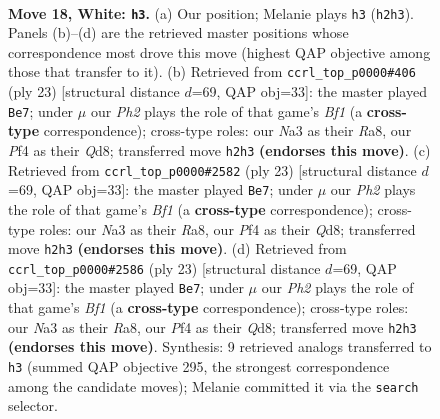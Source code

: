 \documentclass[11pt]{article}
\begin{document}
\clearpage

\begin{figure}[p]\centering
\begin{subfigure}{0.46\textwidth}\centering
\resizebox{\linewidth}{!}{%
\newchessgame
\chessboard[
  setfen={r1b1kbnr/4q3/8/p1p1Ppp1/3p1P1p/NP6/P5PP/R1BQ1BKR w kq - 0 18},
  showmover=false,
  pgfstyle=straightmove, color=movearrow, markmove={h2-h3}
]}
\caption{}
\end{subfigure}\hfill
\begin{subfigure}{0.46\textwidth}\centering
\resizebox{\linewidth}{!}{%
\newchessgame
\chessboard[
  setfen={r2qkb1r/1p1n1pp1/p2p4/N2Ppb1p/8/4BP2/PPPQ2PP/R3KB1R b KQkq - 2 12},
  showmover=false,
  pgfstyle=straightmove, color=movearrow, markmove={f8-e7}
]}
\caption{}
\end{subfigure}
\\[4pt]
\begin{subfigure}{0.46\textwidth}\centering
\resizebox{\linewidth}{!}{%
\newchessgame
\chessboard[
  setfen={r2qkb1r/1p1n1pp1/p2p4/N2Ppb1p/8/4BP2/PPPQ2PP/R3KB1R b KQkq - 2 12},
  showmover=false,
  pgfstyle=straightmove, color=movearrow, markmove={f8-e7}
]}
\caption{}
\end{subfigure}\hfill
\begin{subfigure}{0.46\textwidth}\centering
\resizebox{\linewidth}{!}{%
\newchessgame
\chessboard[
  setfen={r2qkb1r/1p1n1pp1/p2p4/N2Ppb1p/8/4BP2/PPPQ2PP/R3KB1R b KQkq - 2 12},
  showmover=false,
  pgfstyle=straightmove, color=movearrow, markmove={f8-e7}
]}
\caption{}
\end{subfigure}
\caption{\textbf{Move 18, White: \texttt{h3}.} (a) Our position; Melanie plays \texttt{h3} (\texttt{h2h3}). Panels (b)--(d) are the retrieved master positions whose correspondence most drove this move (highest QAP objective among those that transfer to it). (b) Retrieved from \texttt{ccrl\_top\_p0000\#406} (ply 23) [structural distance $d$=69, QAP obj=33]: the master played \texttt{Be7}; under $\mu$ our \emph{Ph2} plays the role of that game's \emph{Bf1} (a \textbf{cross-type} correspondence); cross-type roles: our \emph{N}a3 as their \emph{R}a8, our \emph{P}f4 as their \emph{Q}d8; transferred move \texttt{h2h3} \textbf{(endorses this move)}. (c) Retrieved from \texttt{ccrl\_top\_p0000\#2582} (ply 23) [structural distance $d$=69, QAP obj=33]: the master played \texttt{Be7}; under $\mu$ our \emph{Ph2} plays the role of that game's \emph{Bf1} (a \textbf{cross-type} correspondence); cross-type roles: our \emph{N}a3 as their \emph{R}a8, our \emph{P}f4 as their \emph{Q}d8; transferred move \texttt{h2h3} \textbf{(endorses this move)}. (d) Retrieved from \texttt{ccrl\_top\_p0000\#2586} (ply 23) [structural distance $d$=69, QAP obj=33]: the master played \texttt{Be7}; under $\mu$ our \emph{Ph2} plays the role of that game's \emph{Bf1} (a \textbf{cross-type} correspondence); cross-type roles: our \emph{N}a3 as their \emph{R}a8, our \emph{P}f4 as their \emph{Q}d8; transferred move \texttt{h2h3} \textbf{(endorses this move)}. Synthesis: 9 retrieved analogs transferred to \texttt{h3} (summed QAP objective 295, the strongest correspondence among the candidate moves); Melanie committed it via the \texttt{search} selector.}
\label{fig:thought-m34}
\end{figure}
\end{document}

